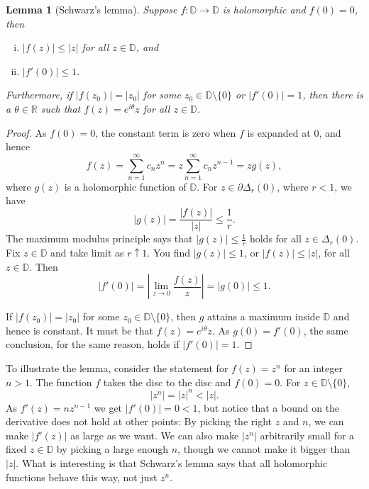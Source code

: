 \documentclass[12pt,openany]{book}
\newcommand{\sabs}[1]{\lvert {#1} \rvert}
\newcommand{\abs}[1]{\left\lvert {#1} \right\rvert}
\newcommand{\R}{{\mathbb{R}}}
\newcommand{\D}{{\mathbb{D}}}
\theoremstyle{plain}
\newtheorem{lemma}[thm]{Lemma}
\theoremstyle{remark}
\theoremstyle{definition}
\theoremstyle{exercise}
\theoremstyle{example}
\begin{document}
\begin{lemma}[Schwarz's lemma]\label{lemma:schwarz}
Suppose $f \colon \D \to \D$ is holomorphic and $f(0) = 0$,
then 
\begin{enumerate}[(i)]
\item $\sabs{f(z)} \leq \sabs{z}$ for all $z \in \D$, and
\item $\sabs{f'(0)} \leq 1$.
\end{enumerate}
Furthermore, if $\sabs{f(z_0)} = \sabs{z_0}$ for some $z_0 \in \D \setminus
\{ 0 \}$
or $\sabs{f'(0)} = 1$, then
there is a $\theta \in \R$ such that $f(z) =
e^{i\theta} z$ for all $z \in \D$.
\end{lemma}

\begin{proof}
As $f(0) = 0$, the constant term is zero when $f$ is expanded at $0$, and hence
\begin{equation*}
f(z) = \sum_{n=1}^\infty c_n z^n = z \sum_{n=1}^\infty c_n z^{n-1} = z g(z) ,
\end{equation*}
where $g(z)$ is a holomorphic function of $\D$.  For
$z \in \partial \Delta_r(0)$,
where $r < 1$, we have
\begin{equation*}
\sabs{g(z)} = \frac{\sabs{f(z)}}{\sabs{z}} \leq \frac{1}{r}  .
\end{equation*}
The maximum modulus principle says that $\sabs{g(z)} \leq \frac{1}{r}$
holds for all $z \in \Delta_r(0)$.
Fix $z \in \D$ and take limit as $r \uparrow 1$. 
You find
$\sabs{g(z)} \leq 1$,
or
$\sabs{f(z)} \leq \sabs{z}$,
for all $z \in \D$.  Then
\begin{equation*}
\abs{f'(0)}
=
\abs{\lim_{z \to 0} \frac{f(z)}{z}} = \sabs{g(0)} \leq 1 .
\end{equation*}

If $\sabs{f(z_0)} = \sabs{z_0}$ for some $z_0 \in \D \setminus \{ 0 \}$,
then $g$ attains a maximum inside $\D$ and hence is constant.
It must be that $f(z) = e^{i \theta} z$.
As $g(0) = f'(0)$, the same conclusion, for the same reason,
holds if $\sabs{f'(0)} = 1$.
\end{proof}

To illustrate the lemma, consider the statement for $f(z) = z^n$
for an integer $n > 1$.  The function $f$ takes the disc to the disc
and $f(0) = 0$.  For $z \in \D \setminus \{ 0 \}$,
\begin{equation*}
\sabs{z^n} =
\sabs{z}^n < \sabs{z} .
\end{equation*}
As $f'(z) = n z^{n-1}$ we get
$\sabs{f'(0)} = 0 < 1$, but notice that a bound on the derivative
does not hold at other points:
By picking the right $z$ and $n$,
we can make $\sabs{f'(z)}$ as large as we want.
We can also make $\sabs{z^n}$ arbitrarily small for a fixed $z \in \D$ by picking
a large enough $n$, though we cannot make it bigger than $\sabs{z}$.  What is
interesting is that Schwarz's lemma says that all holomorphic functions
behave this way, not just $z^n$.
\end{document}
